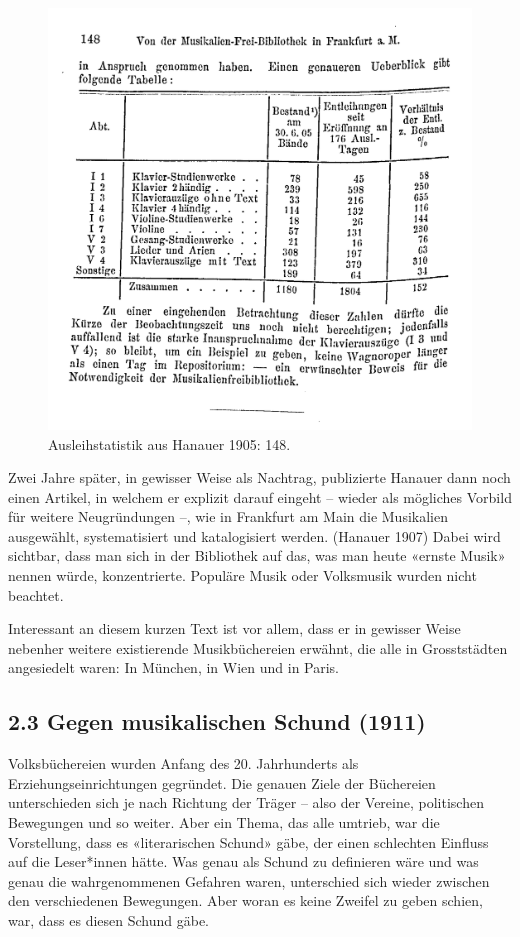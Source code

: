 \documentclass[a4paper,
fontsize=11pt,
oneside,
numbers=noperiodatend,
parskip=half-,
bibliography=totoc,
final
]{scrartcl}
\begin{document}
\begin{figure}
\centering
\includegraphics{files/Hanauer_1905.jpg}
\caption{Ausleihstatistik aus Hanauer 1905: 148.}
\end{figure}

Zwei Jahre später, in gewisser Weise als Nachtrag, publizierte Hanauer
dann noch einen Artikel, in welchem er explizit darauf eingeht -- wieder
als mögliches Vorbild für weitere Neugründungen --, wie in Frankfurt am
Main die Musikalien ausgewählt, systematisiert und katalogisiert werden.
(Hanauer 1907) Dabei wird sichtbar, dass man sich in der Bibliothek auf
das, was man heute «ernste Musik» nennen würde, konzentrierte. Populäre
Musik oder Volksmusik wurden nicht beachtet.

Interessant an diesem kurzen Text ist vor allem, dass er in gewisser
Weise nebenher weitere existierende Musikbüchereien erwähnt, die alle in
Grosststädten angesiedelt waren: In München, in Wien und in Paris.

\hypertarget{gegen-musikalischen-schund-1911}{%
\subsection{2.3 Gegen musikalischen Schund
(1911)}\label{gegen-musikalischen-schund-1911}}

Volksbüchereien wurden Anfang des 20. Jahrhunderts als
Erziehungseinrichtungen gegründet. Die genauen Ziele der Büchereien
unterschieden sich je nach Richtung der Träger -- also der Vereine,
politischen Bewegungen und so weiter. Aber ein Thema, das alle umtrieb,
war die Vorstellung, dass es «literarischen Schund» gäbe, der einen
schlechten Einfluss auf die Leser*innen hätte. Was genau als Schund zu
definieren wäre und was genau die wahrgenommenen Gefahren waren,
unterschied sich wieder zwischen den verschiedenen Bewegungen. Aber
woran es keine Zweifel zu geben schien, war, dass es diesen Schund gäbe.
\end{document}
